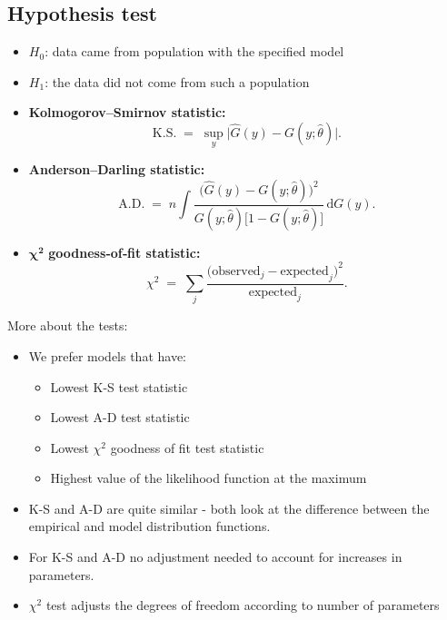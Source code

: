 \documentclass{article}
\begin{document}
\subsection{Hypothesis test}

\begin{itemize}
    \item $H_0$: data came from population with the specified model
    \item $H_1$: the data did not come from such a population
\end{itemize}

\begin{itemize}
  \item \textbf{Kolmogorov--Smirnov statistic:}
  \[
    \mathrm{K.S.}
    \;=\;
    \sup_{y}\bigl|\hat{G}(y) - G(y;\hat{\theta})\bigr|.
  \]
  \item \textbf{Anderson--Darling statistic:}
  \[
    \mathrm{A.D.}
    \;=\;
    n
    \int
      \frac{\bigl(\hat{G}(y) - G(y;\hat{\theta})\bigr)^{2}}
           {G(y;\hat{\theta})\bigl[1 - G(y;\hat{\theta})\bigr]}
    \,\mathrm{d}G(y).
  \]
  \item \(\boldsymbol{\chi^2}\) \textbf{goodness‐of‐fit statistic:}
  \[
    \chi^2
    \;=\;
    \sum_{j}
      \frac{\bigl(\text{observed}_j - \text{expected}_j\bigr)^{2}}
           {\text{expected}_j}.
  \]
\end{itemize}



More about the tests:
\begin{itemize}
    \item We prefer models that have:
    \begin{itemize}
        \item Lowest K-S test statistic
        \item Lowest A-D test statistic
        \item Lowest $\chi^2$ goodness of fit test statistic
        \item Highest value of the likelihood function at the maximum
    \end{itemize}
    \item K-S and A-D are quite similar - both look at the difference between the empirical and model distribution functions.
    \item For K-S and A-D no adjustment needed to account for increases in parameters.
    \item $\chi^2$ test adjusts the degrees of freedom according to number of parameters
\end{itemize}
\end{document}
